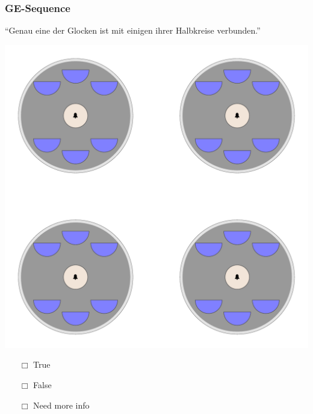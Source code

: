 \documentclass[fleqn,10pt,serif,xcolor=dvipsnames]{beamer}
\newcommand{\GE}{GE\xspace}
\newcommand{\mymark}[1]{{\color{blue}{#1}}}
\begin{document}
\begin{frame}
  \frametitle{\GE-Sequence}
  \begin{center}
    ``Genau eine der Glocken ist mit einigen ihrer Halbkreise verbunden.''

    \vspace{0.1cm}

    \includegraphics[width=0.5 \textwidth]{../../pictures/ge_01_1.pdf}

    \vspace{0.1cm}

    \begin{multicols}{3}
      \begin{itemize} 
      \item[$\Box$] True\\
        \onslide<2>{$\leadsto$  \mymark{false}}
      \item[$\Box$] False\\
        \onslide<2>{$\leadsto$ \mymark{false}}
      \item[$\Box$] Need more info 
      \end{itemize}
    \end{multicols}

  \end{center}
\end{frame}
\end{document}
